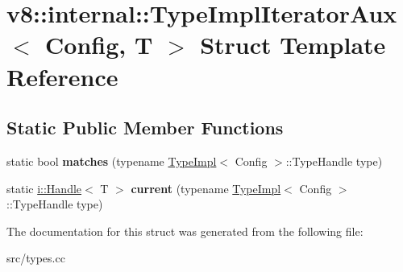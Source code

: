\hypertarget{structv8_1_1internal_1_1_type_impl_iterator_aux}{}\section{v8\+:\+:internal\+:\+:Type\+Impl\+Iterator\+Aux$<$ Config, T $>$ Struct Template Reference}
\label{structv8_1_1internal_1_1_type_impl_iterator_aux}
\subsection*{Static Public Member Functions}
\begin{DoxyCompactItemize}
\item 
\hypertarget{structv8_1_1internal_1_1_type_impl_iterator_aux_a29a78da11accc91b2e9ccbfa71aa8b42}{}static bool {\bfseries matches} (typename \hyperlink{classv8_1_1internal_1_1_type_impl}{Type\+Impl}$<$ Config $>$\+::Type\+Handle type)\label{structv8_1_1internal_1_1_type_impl_iterator_aux_a29a78da11accc91b2e9ccbfa71aa8b42}

\item 
\hypertarget{structv8_1_1internal_1_1_type_impl_iterator_aux_a449bdf76b6629548e8873ebe382235e8}{}static \hyperlink{classv8_1_1internal_1_1_handle}{i\+::\+Handle}$<$ T $>$ {\bfseries current} (typename \hyperlink{classv8_1_1internal_1_1_type_impl}{Type\+Impl}$<$ Config $>$\+::Type\+Handle type)\label{structv8_1_1internal_1_1_type_impl_iterator_aux_a449bdf76b6629548e8873ebe382235e8}

\end{DoxyCompactItemize}


The documentation for this struct was generated from the following file\+:\begin{DoxyCompactItemize}
\item 
src/types.\+cc\end{DoxyCompactItemize}
